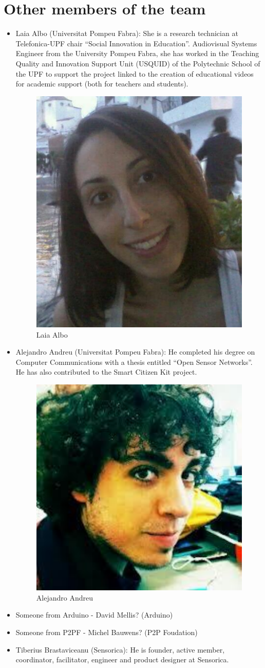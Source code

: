 \documentclass[a4paper,oneside]{book}   %
\begin{document}
\section{Other members of the team}
\begin{itemize}
\item Laia Albo (Universitat Pompeu Fabra): She is a research technician at Telefonica-UPF chair ``Social Innovation in Education''. Audiovisual Systems Engineer from the University Pompeu Fabra, she has worked in the Teaching Quality and Innovation Support Unit (USQUID) of the Polytechnic School of the UPF to support the project linked to the creation of educational videos for academic support (both for teachers and students).
\begin{figure}
\begin{center}
\includegraphics[width=0.200\linewidth]{laia}
\caption{Laia Albo}
\label{fig:jaume}
\end{center}
\end{figure}
\item Alejandro Andreu (Universitat Pompeu Fabra): He completed his degree on Computer Communications with a thesis entitled ``Open Sensor Networks''. He has also contributed to the Smart Citizen Kit project.
\begin{figure}
\begin{center}
\includegraphics[width=0.200\linewidth]{alejandro}
\caption{Alejandro Andreu}
\label{fig:jaume}
\end{center}
\end{figure}
\item Someone from Arduino - David Mellis? (Arduino)
\item Someone from P2PF - Michel Bauwens? (P2P Foudation)
\item Tiberius Brastaviceanu (Sensorica): He is founder, active member, coordinator, facilitator, engineer and product designer at Sensorica.

\end{itemize}
\end{document}
